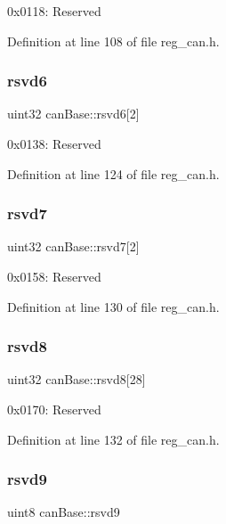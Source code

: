 0x0118\+: Reserved 

Definition at line 108 of file reg\+\_\+can.\+h.

\mbox{\label{structcanBase_ac9aeb23c96b23176a09099f5d187ee3a}} 
\subsubsection{\texorpdfstring{rsvd6}{rsvd6}}
{\footnotesize\ttfamily uint32 can\+Base\+::rsvd6\mbox{[}2\mbox{]}}

0x0138\+: Reserved 

Definition at line 124 of file reg\+\_\+can.\+h.

\mbox{\label{structcanBase_a15f2853cb362b8efebdcf5db9eccb1d3}} 
\subsubsection{\texorpdfstring{rsvd7}{rsvd7}}
{\footnotesize\ttfamily uint32 can\+Base\+::rsvd7\mbox{[}2\mbox{]}}

0x0158\+: Reserved 

Definition at line 130 of file reg\+\_\+can.\+h.

\mbox{\label{structcanBase_a4328aff3c54308138d799f9da22921ea}} 
\subsubsection{\texorpdfstring{rsvd8}{rsvd8}}
{\footnotesize\ttfamily uint32 can\+Base\+::rsvd8\mbox{[}28\mbox{]}}

0x0170\+: Reserved 

Definition at line 132 of file reg\+\_\+can.\+h.

\mbox{\label{structcanBase_a70e85f20ad79ddd592f6294ecf336d6c}} 
\subsubsection{\texorpdfstring{rsvd9}{rsvd9}}
{\footnotesize\ttfamily uint8 can\+Base\+::rsvd9}

